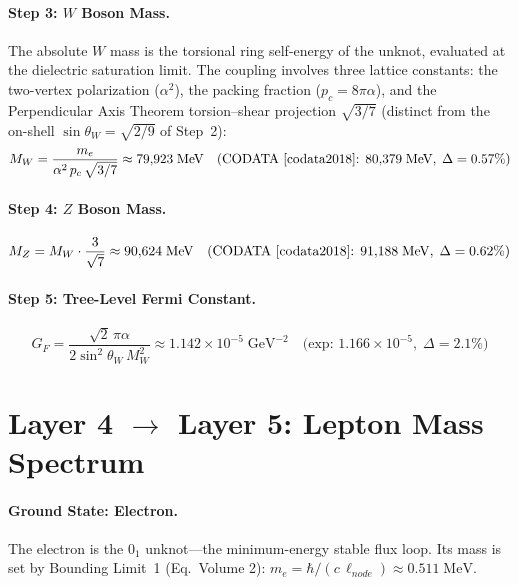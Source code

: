 \paragraph{Step 3: $W$ Boson Mass.}
The absolute $W$ mass is the torsional ring self-energy of the unknot,
evaluated at the dielectric saturation limit. The coupling involves three
lattice constants: the two-vertex polarization ($\alpha^2$), the packing
fraction ($p_c = 8\pi\alpha$), and the Perpendicular Axis Theorem
torsion--shear projection $\sqrt{3/7}$ (distinct from the on-shell
$\sin\theta_W = \sqrt{2/9}$ of Step~2):
\begin{equation}
    M_W = \frac{m_e}{\alpha^2\,p_c\,\sqrt{3/7}}
    \approx 79{,}923\;\text{MeV}
    \quad\text{(CODATA~\cite{codata2018}: } 80{,}379\;\text{MeV},\; \Delta = 0.57\%\text{)}
    \label{eq:MW}
\end{equation}

\paragraph{Step 4: $Z$ Boson Mass.}
\begin{equation}
    M_Z = M_W \cdot \frac{3}{\sqrt{7}}
    \approx 90{,}624\;\text{MeV}
    \quad\text{(CODATA~\cite{codata2018}: } 91{,}188\;\text{MeV},\; \Delta = 0.62\%\text{)}
    \label{eq:MZ}
\end{equation}

\paragraph{Step 5: Tree-Level Fermi Constant.}
\begin{equation}
    G_F = \frac{\sqrt{2}\,\pi\alpha}{2\sin^2\!\theta_W\,M_W^2}
    \approx 1.142 \times 10^{-5}\;\text{GeV}^{-2}
    \quad\text{(exp: } 1.166 \times 10^{-5},\; \Delta = 2.1\%\text{)}
    \label{eq:GF}
\end{equation}

\section{Layer 4 $\to$ Layer 5: Lepton Mass Spectrum}
\label{sec:layer45}

\paragraph{Ground State: Electron.}
The electron is the $0_1$ unknot---the minimum-energy stable flux loop.
Its mass is set by Bounding Limit~1 (Eq.~Volume 2):
$m_e = \hbar / (c\,\ell_{node}) \approx 0.511\;\text{MeV}$.

